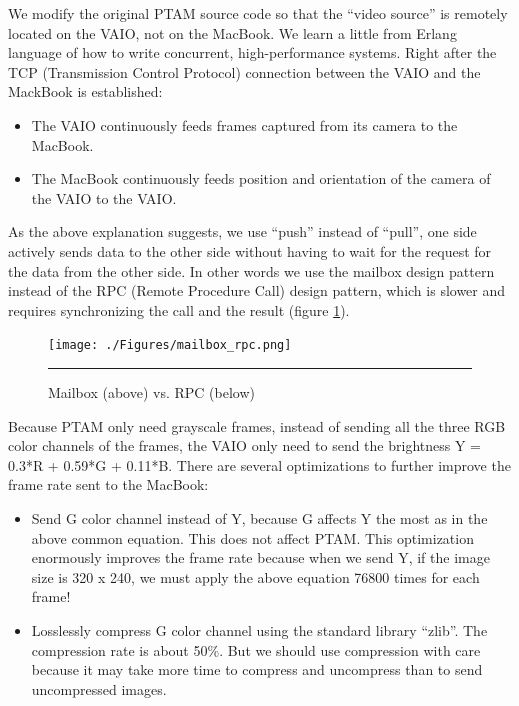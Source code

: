 We modify the original PTAM source code so that the ``video source'' is remotely located on the VAIO, not on the MacBook. We learn a little from Erlang language \cite{Reference17} of how to write concurrent, high-performance systems. Right after the TCP (Transmission Control Protocol) connection between the VAIO and the MackBook is established:

\begin{itemize}
	\item The VAIO continuously feeds frames captured from its camera to the MacBook.
	\item The MacBook continuously feeds position and orientation of the camera of the VAIO to the VAIO.
\end{itemize}

As the above explanation suggests, we use ``push'' instead of ``pull'', one side actively sends data to the other side without having to wait for the request for the data from the other side. In other words we use the mailbox design pattern instead of the RPC (Remote Procedure Call) design pattern, which is slower and requires synchronizing the call and the result (figure \ref{fig:MailboxRPC}).

\begin{figure}[htbp]
	\centering
	\texttt{[image: ./Figures/mailbox\_rpc.png]}
	\rule{35em}{0.5pt}
	\caption[Mailbox vs. RPC]{Mailbox (above) vs. RPC (below)}
	\label{fig:MailboxRPC}
\end{figure}

Because PTAM only need grayscale frames, instead of sending all the three RGB color channels of the frames, the VAIO only need to send the brightness Y = 0.3*R + 0.59*G + 0.11*B. There are several optimizations to further improve the frame rate sent to the MacBook:

\begin{itemize}
	\item Send G color channel instead of Y, because G affects Y the most as in the above common equation. This does not affect PTAM. This optimization enormously improves the frame rate because when we send Y, if the image size is 320 x 240, we must apply the above equation 76800 times for each frame!
	\item Losslessly compress G color channel using the standard library ``zlib''. The compression rate is about 50\%. But we should use compression with care because it may take more time to compress and uncompress than to send uncompressed images.
\end{itemize}

